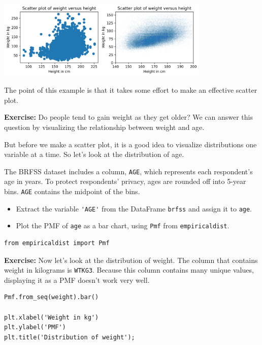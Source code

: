 \begin{center}
\includegraphics[width=4in]{chapters/09_relationships_files/09_relationships_27_0.png}
\end{center}

The point of this example is that it takes some effort to make an
effective scatter plot.

\textbf{Exercise:} Do people tend to gain weight as they get older? We
can answer this question by visualizing the relationship between weight
and age.

But before we make a scatter plot, it is a good idea to visualize
distributions one variable at a time. So let's look at the distribution
of age.

The BRFSS dataset includes a column, \passthrough{\lstinline!AGE!},
which represents each respondent's age in years. To protect respondents'
privacy, ages are rounded off into 5-year bins.
\passthrough{\lstinline!AGE!} contains the midpoint of the bins.

\begin{itemize}
\item
  Extract the variable \passthrough{\lstinline!'AGE'!} from the
  DataFrame \passthrough{\lstinline!brfss!} and assign it to
  \passthrough{\lstinline!age!}.
\item
  Plot the PMF of \passthrough{\lstinline!age!} as a bar chart, using
  \passthrough{\lstinline!Pmf!} from
  \passthrough{\lstinline!empiricaldist!}.
\end{itemize}

\begin{lstlisting}[]
from empiricaldist import Pmf
\end{lstlisting}

\textbf{Exercise:} Now let's look at the distribution of weight. The
column that contains weight in kilograms is
\passthrough{\lstinline!WTKG3!}. Because this column contains many
unique values, displaying it as a PMF doesn't work very well.

\begin{lstlisting}[]
Pmf.from_seq(weight).bar()

plt.xlabel('Weight in kg')
plt.ylabel('PMF')
plt.title('Distribution of weight');
\end{lstlisting}

